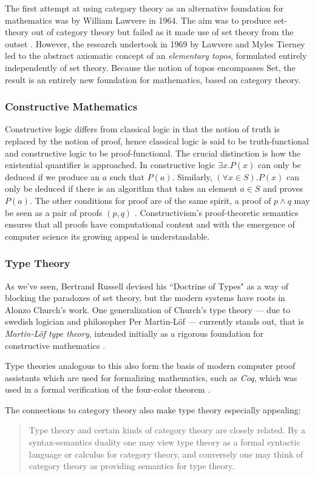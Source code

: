 \documentclass[12p]{article}
\theoremstyle{definition}
\begin{document}
The first attempt at using category theory as an alternative foundation for mathematics was by William Lawvere in 1964. The aim was to produce set-theory out of category theory but failed as it made use of set theory from the outset \cite{goldblatt2014topoi}. However, the research undertook in 1969 by Lawvere and Myles Tierney led to the abstract axiomatic concept of an \textit{elementary topos}, formulated entirely independently of set theory. Because the notion of topos encompasses \textsf{Set}, the result is an entirely new foundation for mathematics, based on category theory.
\subsubsection{Constructive Mathematics}
Constructive logic differs from classical logic in that the notion of truth is replaced by the notion of proof, hence classical logic is said to be truth-functional and constructive logic to be proof-functional. The crucial distinction is how the existential quantifier is approached. In constructive logic $\exists x. P(x)$ can only be deduced if we produce an $a$ such that $P(a)$. Similarly, $(\forall x \in S). P(x)$ can only be deduced if there is an algorithm that takes an element $a \in S$ and proves $P(a)$. The other conditions for proof are of the same spirit, a proof of $p \wedge q$ may be seen as a pair of proofs $(p, q)$ \cite{thompson1991type}.
Constructivism's proof-theoretic semantics ensures that all proofs have computational content and with the emergence of computer science its growing appeal is understandable.
\subsubsection{Type Theory}
As we've seen, Bertrand Russell devised his ``Doctrine of Types" as a way of blocking the paradoxes of set theory, but the modern systems have roots in Alonzo Church's work. One generalization of Church's type theory --- due to swedish logician and philosopher Per Martin-Löf --- currently stands out, that is \textit{Martin-Löf type theory}, intended initially as a rigorous foundation for constructive mathematics \cite{awodey2013voevodsky}.


 Type theories analogous to this also form the basis of modern computer proof assistants which are used for formalizing mathematics, such as \textit{Coq}, which was used in a formal verification of the four-color theorem \cite{gonthier2008formal}. 


The connections to category theory also make type theory especially appealing:
\begin{quote}
	Type theory and certain kinds of category theory are closely related. By a syntax-semantics duality one may view type theory as a formal syntactic language or calculus for category theory, and conversely one may think of category theory as providing semantics for type theory.\cite{nlab:relation_between_type_theory_and_category_theory}
\end{quote}
\end{document}
